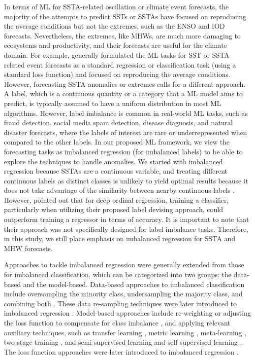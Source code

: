\documentclass[11pt, a4paper]{article}
\begin{document}
In terms of ML for SSTA-related oscillation or climate event forecasts, the majority of the attempts to predict SSTs or SSTAs have focused on reproducing the average conditions but not the extremes, such as the ENSO \citep{ham2019deep,taylor2022deep,boschetti2022sea} and IOD \citep{wu2019seasonal,ratnam2020machine,fengpredictability} forecasts. Nevertheless, the extremes, like MHWs, are much more damaging to ecosystems and productivity, and their forecasts are useful for the climate domain. For example, \citet{ham2019deep,pravallika2022prediction,taylor2022deep} generally formulated the ML tasks for SST or SSTA-related event forecasts as a standard regression or classification task (using a standard loss function) and focused on reproducing the average conditions. However, forecasting SSTA anomalies or extremes calls for a different approach. A label, which is a continuous quantity or a category that a ML model aims to predict, is typically assumed to have a uniform distribution in most ML algorithms. However, label imbalance is common in real-world ML tasks, such as fraud detection, social media spam detection, disease diagnosis, and natural disaster forecasts, where the labels of interest are rare or underrepresented when compared to the other labels. In our proposed ML framework, we view the forecasting tasks as imbalanced regression (for imbalanced labels) to be able to explore the techniques to handle anomalies. We started with imbalanced regression because SSTAs are a continuous variable, and treating different continuous labels as distinct classes is unlikely to yield optimal results because it does not take advantage of the similarity between nearby continuous labels \citep{yang2021delving}. However, \citet{berg2021deep} pointed out that for deep ordinal regression, training a classifier, particularly when utilizing their proposed label devising approach, could outperform training a regressor in terms of accuracy. It is important to note that their approach was not specifically designed for label imbalance tasks. Therefore, in this study, we still place emphasis on imbalanced regression for SSTA and MHW forecasts.

Approaches to tackle imbalanced regression were generally extended from those for imbalanced classification, which can be categorized into two groups: the data-based and the model-based. Data-based approaches to imbalanced classification include oversampling the minority class, undersampling the majority class, and combining both \citep{chawla2002smote,garcia2009evolutionary,he2008adasyn}. These data re-sampling techniques were later introduced to imbalanced regression \citep{torgo2013smote,branco2017smogn,yang2021delving}. Model-based approaches include re-weighting or adjusting the loss function to compensate for class imbalance \citep{cao2019learning,cui2019class,dong2018imbalanced,huang2016learning,huang2019deep}, and applying relevant auxiliary techniques, such as transfer learning \citep{yin2019feature}, metric learning \citep{zhang2017mixup}, meta-learning \citep{shu2019meta}, two-stage training \citep{kang2019decoupling}, and semi-supervised learning and self-supervised learning \citep{yang2020rethinking}. The loss function approaches were later introduced to imbalanced regression \citep{yang2021delving,ren2022balanced}.
\end{document}
